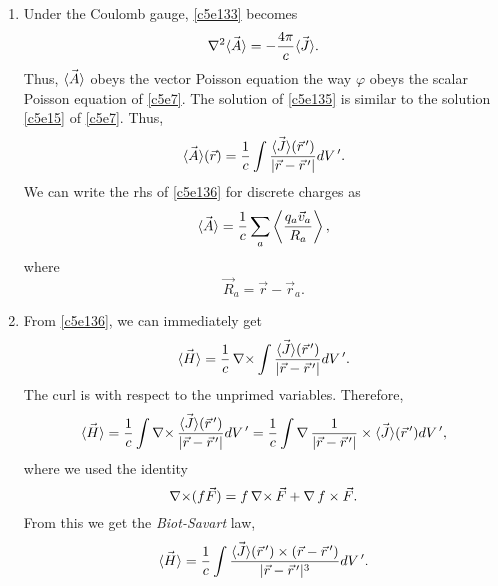 \begin{enumerate}
\item Under the Coulomb gauge, \eqref{c5e133} becomes
\begin{equation}\label{c5e135}
\nabla^2\vec{\left\langle{A}\right\rangle} = -\frac{4\pi}{c}\vec{\left\langle{J}\right\rangle}.
\end{equation}
Thus, $\vec{\left\langle{A}\right\rangle}$ obeys the vector Poisson equation the way $\varphi$ obeys the
scalar Poisson equation of \eqref{c5e7}. The solution of \eqref{c5e135} is 
similar to the solution \eqref{c5e15} of \eqref{c5e7}. Thus,
\begin{equation}\label{c5e136}
\vec{\left\langle{A}\right\rangle}(\vec{r}) = \frac{1}{c}\int
\frac{\vec{\left\langle{J}\right\rangle}(\vec{r}^{\,\prime})}{|\vec{r} - \vec{r}^{\,\prime}|}dV^{\,\prime}.
\end{equation}
We can write the rhs of \eqref{c5e136} for discrete charges as
\begin{equation}\label{c5e137}
\vec{\left\langle{A}\right\rangle} = \frac{1}{c}\sum_a \left\langle{\frac{q_a\vec{v}_a}{R_a}}\right\rangle,
\end{equation}
where 
\begin{equation}\label{c5e138}
\vec{R}_a = \vec{r} - \vec{r}_a.
\end{equation}

\item From \eqref{c5e136}, we can immediately get
\[
\vec{\left\langle{H}\right\rangle} = \frac{1}{c}\operatorname{\nabla\times}\int\frac{\vec{\left\langle{J}\right\rangle}(\vec{r}^{\,\prime})}{|\vec{r} - 
\vec{r}^{\,\prime}|}dV^{\,\prime}.
\]
The curl is with respect to the unprimed variables. Therefore,
\[
\vec{\left\langle{H}\right\rangle} = \frac{1}{c}\int
\operatorname{\nabla\times}\frac{\vec{\left\langle{J}\right\rangle}(\vec{r}^{\,\prime})}{|\vec{r} - \vec{r}^{\,\prime}|}dV^{\,\prime}
 = \frac{1}{c}\int
 \operatorname{\nabla}\frac{1}{|\vec{r} - \vec{r}^{\,\prime}|} \times \vec{\left\langle{J}\right\rangle}(\vec{r}^{\,\prime})dV^{\,\prime},
\]
where we used the identity
\begin{equation}\label{c5e139}
\operatorname{\nabla\times}(f\vec{F}) = f\operatorname{\nabla\times}\vec{F} + \operatorname{\nabla} f \times \vec{F}.
\end{equation}
From this we get the \emph{Biot-Savart} law,
\begin{equation}\label{c5e140}
\vec{\left\langle{H}\right\rangle} = \frac{1}{c}\int\frac{\vec{\left\langle{J}\right\rangle}(\vec{r}^{\,\prime}) \times 
(\vec{r} - \vec{r}^{\,\prime})}{|\vec{r} - \vec{r}^{\,\prime}|^3}dV^{\,\prime}.
\end{equation}


\end{enumerate}
